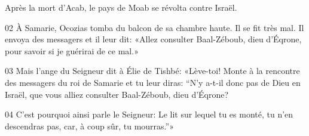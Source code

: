 Après la mort d’Acab, le pays de Moab se révolta contre Israël.

02 À Samarie, Ocozias tomba du balcon de sa chambre haute. Il se fit très mal. Il envoya des messagers et il leur dit: «Allez consulter Baal-Zéboub, dieu d’Éqrone, pour savoir si je guérirai de ce mal.»

03 Mais l’ange du Seigneur dit à Élie de Tishbé: «Lève-toi! Monte à la rencontre des messagers du roi de Samarie et tu leur diras: “N’y a-t-il donc pas de Dieu en Israël, que vous alliez consulter Baal-Zéboub, dieu d’Éqrone?

04 C’est pourquoi ainsi parle le Seigneur: Le lit sur lequel tu es monté, tu n’en descendras pas, car, à coup sûr, tu mourras.”» 
